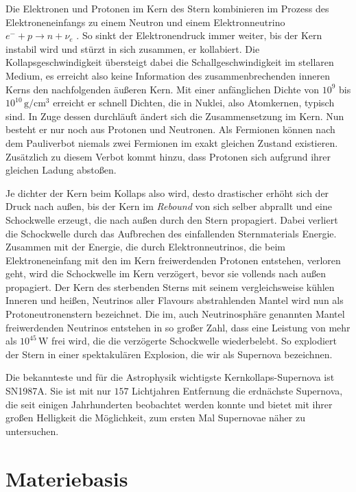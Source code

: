 Die Elektronen und Protonen im Kern des Stern kombinieren im Prozess des Elektroneneinfangs zu einem Neutron und einem Elektronneutrino $e^- + p \rightarrow n + \nu_e$ \cite{supernovaepaper}.
So sinkt der Elektronendruck immer weiter, bis der Kern instabil wird und stürzt in sich zusammen, er kollabiert.
Die Kollapsgeschwindigkeit übersteigt dabei die Schallgeschwindigkeit im stellaren Medium, es erreicht also keine Information des zusammenbrechenden inneren Kerns den nachfolgenden äußeren Kern.
Mit einer anfänglichen Dichte von $10^9$ bis $10^{10} \, \si{\gram \per \centi\cubic\meter}$ erreicht er schnell Dichten, die in Nuklei, also Atomkernen, typisch sind.
In Zuge dessen durchläuft ändert sich die Zusammensetzung im Kern.
Nun besteht er nur noch aus Protonen und Neutronen.
Als Fermionen können nach dem Pauliverbot niemals zwei Fermionen im exakt gleichen Zustand existieren.
Zusätzlich zu diesem Verbot kommt hinzu, dass Protonen sich aufgrund ihrer gleichen Ladung abstoßen.

Je dichter der Kern beim Kollaps also wird, desto drastischer erhöht sich der Druck nach außen, bis der Kern im \textit{Rebound} von sich selber abprallt und eine Schockwelle erzeugt, die nach außen durch den Stern propagiert.
Dabei verliert die Schockwelle durch das Aufbrechen des einfallenden Sternmaterials Energie.
Zusammen mit der Energie, die durch Elektronneutrinos, die beim Elektroneneinfang mit den im Kern freiwerdenden Protonen entstehen, verloren geht, wird die Schockwelle im Kern verzögert, bevor sie vollends nach außen propagiert.
Der Kern des sterbenden Sterns mit seinem vergleichsweise kühlen Inneren und heißen, Neutrinos aller Flavours abstrahlenden Mantel wird nun als Protoneutronenstern bezeichnet.
Die im, auch Neutrinosphäre genannten Mantel freiwerdenden Neutrinos entstehen in so großer Zahl, dass eine Leistung von mehr als $10^{45} \,\si{\watt}$ \cite{supernovaepaper} frei wird, die die verzögerte Schockwelle wiederbelebt.
So explodiert der Stern in einer spektakulären Explosion, die wir als Supernova bezeichnen.

Die bekannteste und für die Astrophysik wichtigste Kernkollaps-Supernova ist SN1987A.
Sie ist mit nur $157$ Lichtjahren Entfernung die erdnächste Supernova, die seit einigen Jahrhunderten beobachtet werden konnte und bietet mit ihrer großen Helligkeit die Möglichkeit, zum ersten Mal Supernovae näher zu untersuchen.

\section{Materiebasis} %
\label{subsec:materiebasis}

